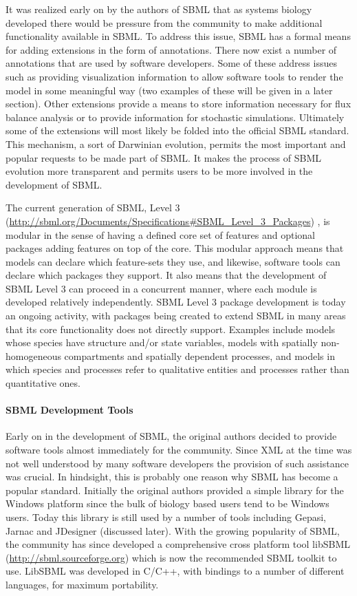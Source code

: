 It was realized early on by the authors of SBML that as systems biology
developed there would be pressure from the community to make additional
functionality available in SBML. To address this issue, SBML has a
formal means for adding extensions in the form of annotations. There now
exist a number of annotations that are used by software developers. Some
of these address issues such as providing visualization information to
allow software tools to render the model in some meaningful way (two
examples of these will be given in a later section). Other extensions
provide a means to store information necessary for flux balance analysis
or to provide information for stochastic simulations. Ultimately some of
the extensions will most likely be folded into the official SBML
standard. This mechanism, a sort of Darwinian evolution, permits the
most important and popular requests to be made part of SBML. It makes
the process of SBML evolution more transparent and permits users to be
more involved in the development of SBML.

The current generation of SBML, Level 3
(\url{http://sbml.org/Documents/Specifications#SBML_Level_3_Packages})
\autocite{hucka2010systems}, is modular in the sense of having a defined
core set of features and optional packages adding features on top of the
core. This modular approach means that models can declare which
feature-sets they use, and likewise, software tools can declare which
packages they support. It also means that the development of SBML Level
3 can proceed in a concurrent manner, where each module is developed
relatively independently. SBML Level 3 package development is today an
ongoing activity, with packages being created to extend SBML in many
areas that its core functionality does not directly support. Examples
include models whose species have structure and/or state variables,
models with spatially non-homogeneous compartments and spatially
dependent processes, and models in which species and processes refer to
qualitative entities and processes rather than quantitative ones.

\paragraph{SBML Development Tools \label{libsbml}}

Early on in the development of SBML, the original authors decided to
provide software tools almost immediately for the community. Since XML
at the time was not well understood by many software developers the
provision of such assistance was crucial. In hindsight, this is probably
one reason why SBML has become a popular standard. Initially the
original authors provided a simple library for the Windows platform
since the bulk of biology based users tend to be Windows users. Today
this library is still used by a number of tools including Gepasi, Jarnac
and JDesigner (discussed later). With the growing popularity of SBML,
the community has since developed a comprehensive cross platform tool
libSBML (\url{http://sbml.sourceforge.org}) which is now the recommended
SBML toolkit to use. LibSBML was developed in C/C++, with bindings to a
number of different languages, for maximum portability.

